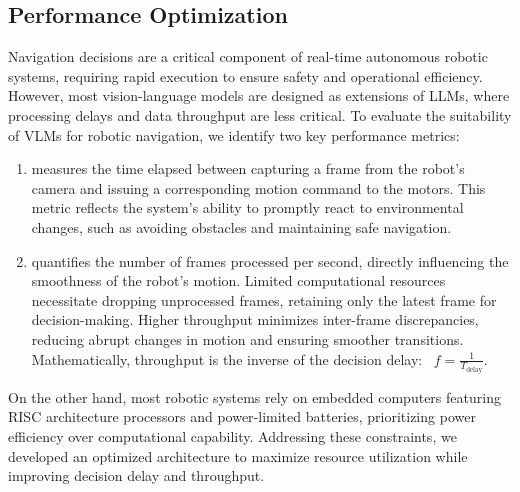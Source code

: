 \vspace{-1mm}
\subsection{Performance Optimization}
Navigation decisions are a critical component of real-time autonomous robotic systems, requiring rapid execution to ensure safety and operational efficiency. However, most vision-language models are designed as extensions of LLMs, where processing delays and data throughput are less critical. To evaluate the suitability of VLMs for robotic navigation, we identify two key performance metrics:
\begin{enumerate}[label={$\arabic*$.},nolistsep,leftmargin=*]
\item  {} measures the time elapsed between capturing a frame from the robot’s camera and issuing a corresponding motion command to the motors. This metric reflects the system's ability to promptly react to environmental changes, such as avoiding obstacles and maintaining safe navigation. 
\item {} quantifies the number of frames processed per second, directly influencing the smoothness of the robot’s motion. Limited computational resources necessitate dropping unprocessed frames, retaining only the latest frame for decision-making. Higher throughput minimizes inter-frame discrepancies, reducing abrupt changes in motion and ensuring smoother transitions. Mathematically, throughput is the inverse of the decision delay: \ie~$f=\frac{1}{T_{\text{delay}}}$.
\end{enumerate}

\vspace{1mm}
\noindent
On the other hand, most robotic systems rely on embedded computers featuring RISC architecture processors and power-limited batteries, prioritizing power efficiency over computational capability. Addressing these constraints, we developed an optimized architecture to maximize resource utilization while improving decision delay and throughput.




